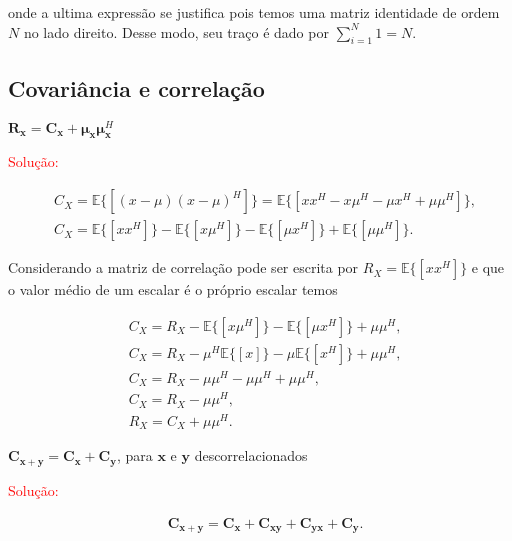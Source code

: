 onde a ultima expressão se justifica pois temos uma matriz identidade de ordem $N$ no lado direito. Desse modo, seu traço é dado por $\sum^{N}_{i = 1} 1 = N$.


\subsection{Covariância e correlação} %
 

            
     $\mathbf{R}_\mathbf{x} = \mathbf{C}_\mathbf{x} + {\mathbf{\mu}}_{\mathbf{x}}{\mathbf{\mu}}_{\mathbf{x}}^H$
    
        \textcolor{red}{Solução:}
        
        \begin{align}
            &C_{X} = \mathbb{E}\{[(x - \mu)(x - \mu)^{H}]\} = \mathbb{E}\{[xx^{H} -x\mu^{H} - \mu x^{H} + \mu \mu^{H}]\}, \\
            &C_{X} = \mathbb{E}\{[xx^{H}]\} -\mathbb{E}\{[x\mu^{H}]\} - \mathbb{E}\{[\mu x^{H}]\} + \mathbb{E}\{[\mu \mu^{H}]\}.
        \end{align}
        
        
        Considerando a matriz de correlação pode ser escrita por $R_{X} = \mathbb{E}\{[xx^{H}]\}$ e que o valor médio de um escalar é o próprio escalar temos
        
        \begin{align}
            &C_{X} = R_{X} - \mathbb{E}\{[x\mu^{H}]\} - \mathbb{E}\{[\mu x^{H}]\} + \mu \mu^{H}, \\
            &C_{X} = R_{X} - \mu^{H}\mathbb{E}\{[x]\} - \mu \mathbb{E}\{[x^{H}]\} + \mu \mu^{H}, \\
            &C_{X} = R_{X} - \mu \mu^{H} - \mu \mu^{H} + \mu \mu^{H}, \\
            &C_{X} = R_{X} - \mu \mu^{H}, \\
            &R_{X} = C_{X} + \mu \mu^{H}.
        \end{align}
    
     $\mathbf{C}_{\mathbf{x} + \mathbf{y}} = \mathbf{C}_{\mathbf{x}} +
    \mathbf{C}_{\mathbf{y}}$, para $\mathbf{x}$ e $\mathbf{y}$ descorrelacionados
    
        \textcolor{red}{Solução:}
        
        \begin{align}
            &\mathbf{C}_{\mathbf{x} + \mathbf{y}} = \mathbf{C}_{\mathbf{x}} + \mathbf{C}_{\mathbf{xy}} + \mathbf{C}_{\mathbf{yx}} + \mathbf{C}_{\mathbf{y}}.
        \end{align}
        
